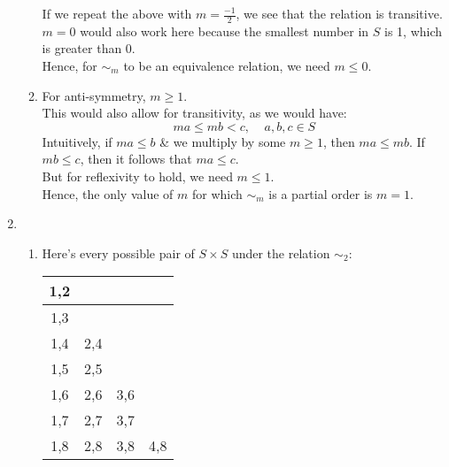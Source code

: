 \documentclass[a4paper, 12pt]{article}
\begin{document}
\begin{enumerate}
\begin{enumerate}
        \noindent If we repeat the above with $m = \frac{-1}{2}$, we see that the relation is transitive. $m=0$ would also work here because the smallest number in $S$ is 1, which is greater than 0. \\

        \noindent Hence, for $\sim_m$ to be an equivalence relation, we need $m \leq 0$. \\

        \item For anti-symmetry, $m \geq 1$. \\
        
        \noindent This would also allow for transitivity, as we would have:
            \begin{equation*}
                ma \leq mb < c, \;\;\;\; a,b,c \in S
            \end{equation*}
        \noindent Intuitively, if $ma \leq b$ \& we multiply by some $m \geq 1$, then $ma \leq mb$. If $mb \leq c$, then it follows that $ma \leq c$. \\

        \noindent But for reflexivity to hold, we need $m \leq 1$. \\
        
        \noindent Hence, the only value of $m$ for which $\sim_m$ is a partial order is $m = 1$. \\
    \end{enumerate}

    \item 
    \begin{enumerate}
        \item Here's every possible pair of $S \times S$ under the relation $\sim_2$:
        \begin{center}
            \begin{tabular}{|c|c|c|c|}
                \hline
                1,2 & & & \\
                \hline
                1,3 & & & \\
                \hline
                1,4 & 2,4 & & \\
                \hline
                1,5 & 2,5 & & \\
                \hline
                1,6 & 2,6 & 3,6 & \\
                \hline
                1,7 & 2,7 & 3,7 & \\
                \hline
                1,8 & 2,8 & 3,8 & 4,8 \\
                \hline
            \end{tabular}
        \end{center}


\end{enumerate}
\end{enumerate}
\end{document}
